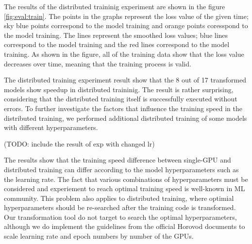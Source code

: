 The results of the distributed traininig experiment 
are shown in the figure \ref{fig:eval:train}.
The points in the graphs represent the loss value of the given time;
sky blue points correspond to the \orgbf model training and
orange points coresspond to the \hvdbf model training.
The lines represent the smoothed loss values;
blue lines correspond to the \orgbf model training
and the red lines correspond to the \hvdbf model training.
As shown in the figure, all of the training data show that
the loss value decreases over time, meaning that the training
process is valid.

The distributed training experiment result show that the 8 out of 17 transformed
models show speedup in distributed traininig. The result is rather surprising,
considering that the distributed training itself is successfully executed
without errors. To further investigate the factors that influence the
training speed in the distributed training, 
we performed additional distributed training of some models with
different hyperparameters.

(TODO: include the result of exp with changed lr)

The results show that the training speed difference between single-GPU and
distributed training can differ according to the model hyperparameters
such as the learning rate. The fact that various combinations of hyperparameters
must be considered and experiement to reach optimal training speed is 
well-known in ML community. This problem also applies to distributed training,
where optimial hyperparameters should be re-searched after the training
code is transformed. Our transformation tool do not target to search the 
optimal hyperparameters, although we do implement the guidelines from the
official Horovod documents to scale learning rate and epoch numbers
by number of the GPUs.  
